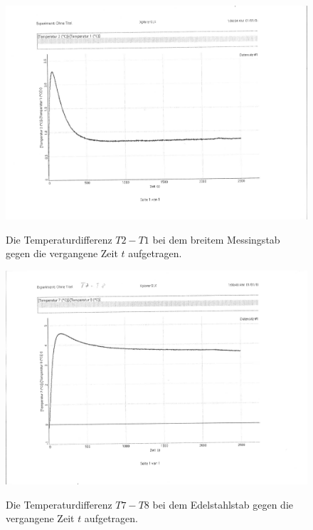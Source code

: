 \begin{figure}
	\centering
	\caption{Die Temperaturdifferenz $T2-T1$ bei dem breitem Messingstab gegen die vergangene Zeit $t$ aufgetragen.}
	\includegraphics[width=\linewidth-70pt,height=\textheight-70pt,keepaspectratio]{content/Bilder/T2-T1-rotated.pdf}
	\label{fig:Graph3}
\end{figure}
\begin{table}
	\centering
	\caption{Der nach Formel \eqref{eq:form1} berechnete Wärmestrom $\frac{\Delta Q_{21}}{\Delta t}$ nach der Zeit $t$ und die aus \ref{fig:Graph3} entnommene Temperaturdifferenz $T2-T1$ bei dem breitem Messingstab.}
	
\end{table}
\begin{figure}
	\centering
	\caption{Die Temperaturdifferenz $T7-T8$ bei dem Edelstahlstab gegen die vergangene Zeit $t$ aufgetragen.}
	\includegraphics[width=\linewidth-70pt,height=\textheight-70pt,keepaspectratio]{content/Bilder/T7-T8-rotated.pdf}
	\label{fig:Graph4}
\end{figure}
\begin{table}
	\centering
	\caption{Der nach Formel \eqref{eq:form1} berechnete Wärmestrom $\frac{\Delta Q_{78}}{\Delta t}$ nach der Zeit $t$ und die aus \ref{fig:Graph4} entnommene Temperaturdifferenz $T7-T8$ bei dem Edelstahlstab.}
	
\end{table}

